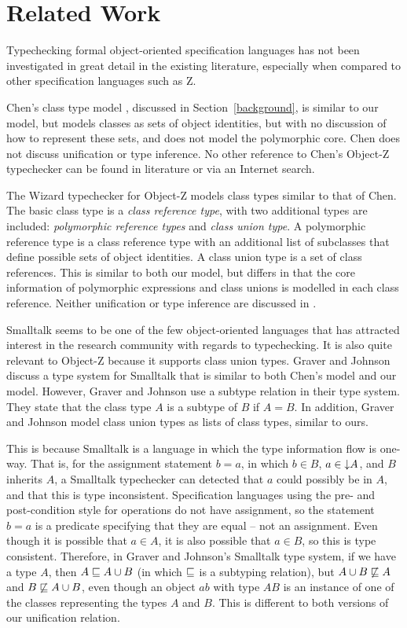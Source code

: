 \section{Related Work}

Typechecking formal object-oriented specification languages has not
been investigated in great detail in the existing literature,
especially when compared to other specification languages such as Z.

Chen's class type model \cite{chen94}, discussed in
Section~\ref{background}, is similar to our model, but models classes as
sets of object identities, but with no discussion of how to represent
these sets, and does not model the polymorphic core. Chen does not
discuss unification or type inference. No other reference to Chen's
Object-Z typechecker can be found in literature or via an Internet
search.

The Wizard typechecker for Object-Z \cite{johnston96} models class
types similar to that of Chen. The basic class type is a {\em class
reference type}, with two additional types are included: {\em
polymorphic reference types} and {\em class union type}. A polymorphic
reference type is a class reference type with an additional list of
subclasses that define possible sets of object identities. A class
union type is a set of class references. This is similar to both our
model, but differs in that the core information of polymorphic
expressions and class unions is modelled in each class
reference. Neither unification or type inference are discussed in
\cite{johnston96}.

Smalltalk \cite{goldberg83} seems to be one of the few object-oriented
languages that has attracted interest in the research community with
regards to typechecking. It is also quite relevant to Object-Z because
it supports class union types. Graver and Johnson \cite{graver90}
discuss a type system for Smalltalk that is similar to both Chen's
model and our model. However, Graver and Johnson use a subtype
relation in their type system.
They state that the class type $A$ is a subtype of
$B$ if $A = B$. In addition, Graver and Johnson model class union
types as lists of class types, similar to ours. 

This is because Smalltalk is a language in which the type information
flow is one-way. That is, for the assignment statement $b = a$, in
which $b \in B$, $a \in \mathord\downarrow A$, and $B$ inherits $A$, a Smalltalk
typechecker can detected that $a$ could possibly be in $A$, and that
this is type inconsistent. Specification languages using the pre- and
post-condition style for operations do not have assignment, so the
statement $b = a$ is a predicate specifying that they are equal -- not
an assignment. Even though it is possible that $a \in A$, it is also
possible that $a \in B$, so this is type consistent. Therefore, in
Graver and Johnson's Smalltalk type system, if we have a type $A$,
then $A \subtypeeq A \classuni B$ (in which $\mathrel{\mathstrut{\sqsubseteq}}$ is a
subtyping relation), but $A \classuni B \not\subtypeeq A$ and $B
\not\subtypeeq A \classuni B$, even though an object $ab$ with type
$AB$ is an instance of one of the classes representing the types $A$
and $B$. This is different to both versions of our unification
relation.
